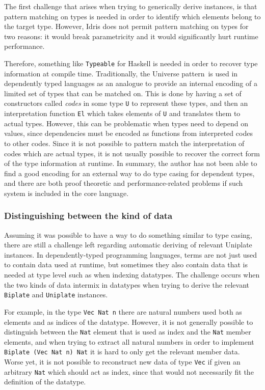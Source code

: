 \documentclass{ituthesis}
\newcommand{\tttype}[1]{\textcolor{type-color}{\texttt{#1}}}
\newcommand{\ttdec}[1]{\textcolor{declared-var-color}{\texttt{#1}}}
\newcommand{\ttvar}[1]{\textcolor{local-var-color}{\texttt{#1}}}
\theoremstyle{break}
\begin{document}
The first challenge that arises when trying to generically derive instances, is that pattern matching on types is needed in order to identify which elements belong to the target type.
However, Idris does not permit pattern matching on types for two reasons: it would break parametricity and it would significantly hurt runtime performance.

Therefore, something like \tttype{Typeable} for Haskell is needed in order to recover type information at compile time.
Traditionally, the Universe pattern\,\autocite{altenkirch2007generic} is used in dependently typed languages as an analogue to provide an internal encoding of a limited set of types that can be matched on.
This is done by having a set of constructors called \textit{codes} in some type \tttype{U} to represent these types, and then an interpretation function \ttdec{El} which takes elements of \tttype{U} and translates them to actual types.
However, this can be problematic when types need to depend on values, since dependencies must be encoded as functions from interpreted codes to other codes.
Since it is not possible to pattern match the interpretation of codes which are actual types, it is not usually possible to recover the correct form of the type information at runtime.
In summary, the author has not been able to find a good encoding for an external way to do type casing for dependent types, and there are both proof theoretic and performance-related problems if such system is included in the core language.

\subsubsection{Distinguishing between the kind of data}
\label{ssub:Distinguishing between the kind of data}
Assuming it was possible to have a way to do something similar to type casing, there are still a challenge left regarding automatic deriving of
relevant Uniplate instances.
In dependently-typed programming languages, terms are not just used to contain data used at runtime, but sometimes they also contain data
that is needed at type level such as when indexing datatypes.
The challenge occurs when the two kinds of data intermix in datatypes when trying to derive the relevant \tttype{Biplate} and \tttype{Uniplate} instances.

For example, in the type \tttype{Vec}~\tttype{Nat}~\ttvar{n} there are natural numbers used both as elements and as indices of the datatype.
However, it is not generally possible to distinguish between the \tttype{Nat} element that is used as index and the \tttype{Nat} member elements, and when trying to extract all natural numbers in order to implement \tttype{Biplate}~\texttt{(}\tttype{Vec Nat}~\ttvar{n}\texttt{)}~\tttype{Nat} it is hard to only get the relevant member data.
Worse yet, it is not possible to reconstruct new data of type \tttype{Vec} if given an arbitrary \tttype{Nat} which should act as index, since that would not necessarily fit the definition of the datatype.
\end{document}
